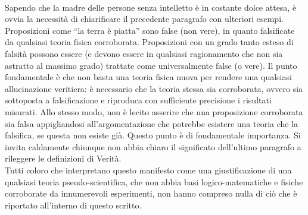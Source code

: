 \documentclass[]{article}
\begin{document}
	\\
	Sapendo che la madre delle persone senza intelletto è in costante dolce attesa, è ovvia la necessità di chiarificare il precedente paragrafo con ulteriori esempi. Proposizioni come \enquote{la terra è piatta} sono false (non vere), in quanto falsificate da qualsiasi teoria fisica corroborata. Proposizioni con un grado tanto esteso di falsità possono essere (e devono essere in qualsiasi ragionamento che non sia astratto al massimo grado) trattate come universalmente false (o vere).
	Il punto fondamentale è che non basta una teoria fisica nuova per rendere una qualsiasi allucinazione veritiera: è necessario che la teoria stessa sia corroborata, ovvero sia sottoposta a falsificazione e riproduca con sufficiente precisione i risultati misurati. Allo stesso modo, non è lecito asserire che una proposizione corroborata sia falsa appigliandosi all'argomentazione che potrebbe esistere una teoria che la falsifica, se questa non esiste già. Questo punto è di fondamentale importanza.		
	Si invita caldamente chiunque non abbia chiaro il significato dell'ultimo paragrafo a rileggere le definizioni di Verità.\\
	Tutti coloro che interpretano questo manifesto come una giustificazione di una qualsiasi teoria pseudo-scientifica, che non abbia basi logico-matematiche e fisiche corroborate da innumerevoli esperimenti, non hanno compreso nulla di ciò che è riportato all'interno di questo scritto.
\end{document}
